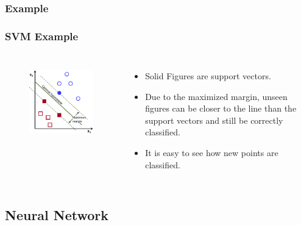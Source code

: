\documentclass[mathserif]{beamer}
\begin{document}
	\subsubsection{Example}
	\begin{frame}
		\frametitle{SVM Example}
		\begin{columns}[t]
			\begin{figure}
				\centering
				\includegraphics[keepaspectratio,scale=2]{SVM.png} \\ \vspace{5px}
			\end{figure}
			
			\begin{itemize}
				\item Solid Figures are support vectors.
				\item Due to the maximized margin, unseen figures can be closer to the line than the support vectors and still be correctly classified.
				\item It is easy to see how new points are classified.
			\end{itemize}
		\end{columns}
	\end{frame}
	
	\subsection{Neural Network}
\end{document}
